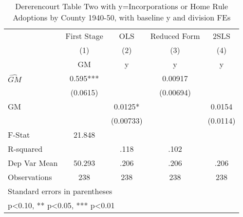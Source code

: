 \begin{table}[htbp]\centering
\def\sym#1{\ifmmode^{#1}\else\(^{#1}\)\fi}
\caption{Dererencourt Table Two with y=Incorporations or Home Rule Adoptions by County 1940-50, with baseline y and division FEs}
\begin{tabular}{l*{4}{c}}
\toprule
                    & First Stage   &         OLS   &Reduced Form   &        2SLS   \\
                    &\multicolumn{1}{c}{(1)}&\multicolumn{1}{c}{(2)}&\multicolumn{1}{c}{(3)}&\multicolumn{1}{c}{(4)}\\
                    &\multicolumn{1}{c}{GM}&\multicolumn{1}{c}{y}&\multicolumn{1}{c}{y}&\multicolumn{1}{c}{y}\\
\midrule
$\hat{GM}$          &       0.595***&               &     0.00917   &               \\
                    &    (0.0615)   &               &   (0.00694)   &               \\
\addlinespace
GM                  &               &      0.0125*  &               &      0.0154   \\
                    &               &   (0.00733)   &               &    (0.0114)   \\
\midrule
F-Stat              &      21.848   &               &               &               \\
R-squared           &               &        .118   &        .102   &               \\
Dep Var Mean        &      50.293   &        .206   &        .206   &        .206   \\
Observations        &         238   &         238   &         238   &         238   \\
\bottomrule
\multicolumn{5}{l}{\footnotesize Standard errors in parentheses}\\
\multicolumn{5}{l}{\footnotesize * p<0.10, ** p<0.05, *** p<0.01}\\
\end{tabular}
\end{table}
